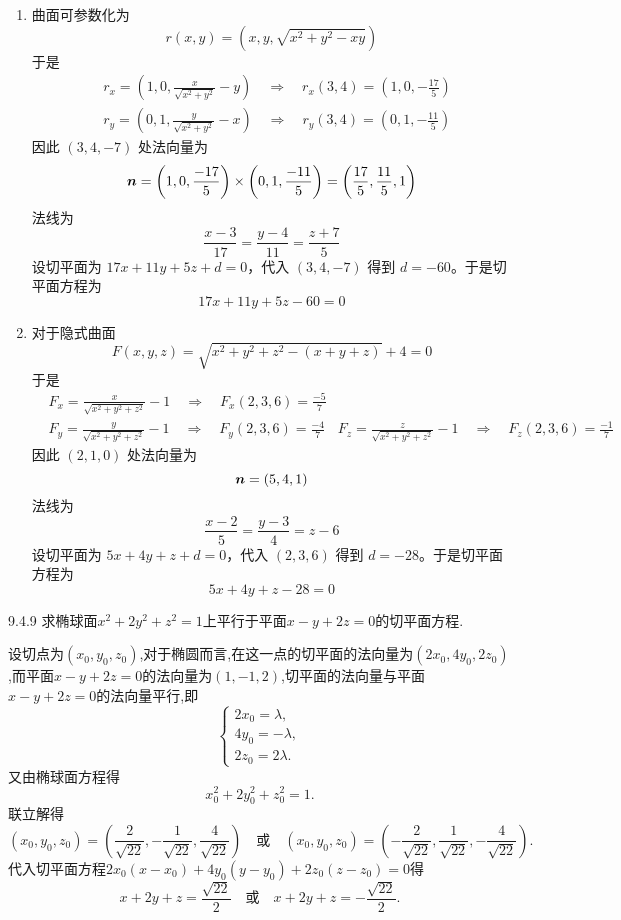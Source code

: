 \begin{solution}
    \begin{enumerate}
        \item 曲面可参数化为
        \[
        r(x, y) = \left( x, y, \sqrt{x^2 + y^2 - xy} \right)
        \]
        于是\begin{align*}
            &r_x = \left( 1, 0, \frac{x}{\sqrt{x^2 + y^2}} - y \right) \quad \Rightarrow \quad r_x(3, 4) = \left( 1, 0, -\frac{17}{5} \right)\\
            &r_y = \left( 0, 1, \frac{y}{\sqrt{x^2 + y^2}} - x \right) \quad \Rightarrow \quad r_y(3, 4) = \left( 0, 1, -\frac{11}{5} \right)
        \end{align*}
        因此 $(3, 4, -7)$ 处法向量为
\[
\bm{n} = \left( 1, 0, \frac{-17}{5} \right) \times \left( 0, 1, \frac{-11}{5} \right) = \left( \frac{17}{5}, \frac{11}{5}, 1 \right)
\]
法线为
\[
\frac{x - 3}{17} = \frac{y - 4}{11} = \frac{z + 7}{5}
\]
设切平面为 $17x + 11y + 5z + d = 0$，代入 $(3, 4, -7)$ 得到 $d = -60$。于是切平面方程为
\[
17x + 11y + 5z - 60 = 0
\]
\item 
对于隐式曲面
\[
F(x, y, z) = \sqrt{x^2 + y^2 + z^2 - (x + y + z)} + 4 = 0
\]
于是\begin{align*}
   & F_x = \frac{x}{\sqrt{x^2 + y^2 + z^2}} - 1 \quad \Rightarrow \quad F_x(2, 3, 6) = \frac{-5}{7}\\
    &F_y = \frac{y}{\sqrt{x^2 + y^2 + z^2}} - 1 \quad \Rightarrow \quad F_y(2, 3, 6) = \frac{-4}{7}
    &F_z = \frac{z}{\sqrt{x^2 + y^2 + z^2}} - 1 \quad \Rightarrow \quad F_z(2, 3, 6) = \frac{-1}{7}
\end{align*}
因此 $(2, 1, 0)$ 处法向量为
\[
\bm{n} = (5, 4, 1)
\]法线为
\[
\frac{x - 2}{5} = \frac{y - 3}{4} = z - 6
\]设切平面为 $5x + 4y + z + d = 0$，代入 $(2, 3, 6)$ 得到 $d = -28$。于是切平面方程为
\[
5x + 4y + z - 28 = 0
\]

    \end{enumerate}
\end{solution}

\begin{exercise}{9.4.9}
求椭球面$x^2+2y^2+z^2=1$上平行于平面$x-y+2z=0$的切平面方程.
\end{exercise}

\begin{solution}
    设切点为$(x_0,y_0,z_0)$,对于椭圆而言,在这一点的切平面的法向量为$(2x_0, 4y_0, 2z_0)$,而平面$x-y+2z=0$的法向量为$(1, -1, 2)$,切平面的法向量与平面$x-y+2z=0$的法向量平行,即
    $$
    \begin{cases}
        2x_0 = \lambda,\\
        4y_0 = -\lambda,\\
        2z_0 = 2\lambda.
    \end{cases}
    $$
    又由椭球面方程得
    $$
    x_0^2 + 2y_0^2 + z_0^2 = 1.
    $$
    联立解得
    $$
    (x_0, y_0, z_0) = \left( \frac{2}{\sqrt{22}}, -\frac{1}{\sqrt{22}}, \frac{4}{\sqrt{22}} \right) \quad \text{或} \quad (x_0, y_0, z_0) = \left( -\frac{2}{\sqrt{22}}, \frac{1}{\sqrt{22}}, -\frac{4}{\sqrt{22}} \right).
    $$
    代入切平面方程$2x_0(x-x_0) + 4y_0(y-y_0) + 2z_0(z-z_0) = 0$得
    $$
    x + 2y + z = \frac{\sqrt{22}}{2} \quad \text{或} \quad x + 2y + z = -\frac{\sqrt{22}}{2}.
    $$
\end{solution}

